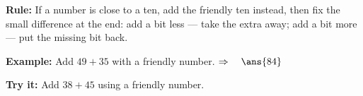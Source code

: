 \documentclass[12pt]{article}
\begin{document}

\begin{formulabox}
\textbf{Rule:} If a number is close to a ten, add the friendly ten instead,
then fix the small difference at the end: add a bit less --- take the extra
away; add a bit more --- put the missing bit back.
\end{formulabox}

\begin{examplebox}
\textbf{Example:} \quad Add $49 + 35$ with a friendly number.
$\Rightarrow\quad \ans{84}$
\end{examplebox}

\begin{tryitbox}
\textbf{Try it:} \quad Add $38 + 45$ using a friendly number.\\[2pt]
\end{tryitbox}
\end{document}
